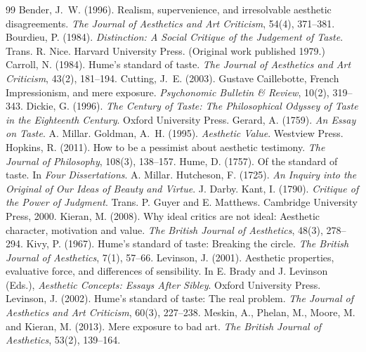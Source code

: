 \documentclass{situationist-preprint}
\begin{document}
\begin{thebibliography}{99}\small
{} Bender, J.~W. (1996). Realism, supervenience, and irresolvable aesthetic disagreements. \emph{The Journal of Aesthetics and Art Criticism}, 54(4), 371--381.
 Bourdieu, P. (1984). \emph{Distinction: A Social Critique of the Judgement of Taste}. Trans. R. Nice. Harvard University Press. (Original work published 1979.)
 Carroll, N. (1984). Hume's standard of taste. \emph{The Journal of Aesthetics and Art Criticism}, 43(2), 181--194.
 Cutting, J.~E. (2003). Gustave Caillebotte, French Impressionism, and mere exposure. \emph{Psychonomic Bulletin \& Review}, 10(2), 319--343.
 Dickie, G. (1996). \emph{The Century of Taste: The Philosophical Odyssey of Taste in the Eighteenth Century}. Oxford University Press.
 Gerard, A. (1759). \emph{An Essay on Taste}. A. Millar.
 Goldman, A.~H. (1995). \emph{Aesthetic Value}. Westview Press.
 Hopkins, R. (2011). How to be a pessimist about aesthetic testimony. \emph{The Journal of Philosophy}, 108(3), 138--157.
 Hume, D. (1757). Of the standard of taste. In \emph{Four Dissertations}. A. Millar.
 Hutcheson, F. (1725). \emph{An Inquiry into the Original of Our Ideas of Beauty and Virtue}. J. Darby.
 Kant, I. (1790). \emph{Critique of the Power of Judgment}. Trans. P. Guyer and E. Matthews. Cambridge University Press, 2000.
 Kieran, M. (2008). Why ideal critics are not ideal: Aesthetic character, motivation and value. \emph{The British Journal of Aesthetics}, 48(3), 278--294.
 Kivy, P. (1967). Hume's standard of taste: Breaking the circle. \emph{The British Journal of Aesthetics}, 7(1), 57--66.
 Levinson, J. (2001). Aesthetic properties, evaluative force, and differences of sensibility. In E. Brady and J. Levinson (Eds.), \emph{Aesthetic Concepts: Essays After Sibley}. Oxford University Press.
 Levinson, J. (2002). Hume's standard of taste: The real problem. \emph{The Journal of Aesthetics and Art Criticism}, 60(3), 227--238.
 Meskin, A., Phelan, M., Moore, M. and Kieran, M. (2013). Mere exposure to bad art. \emph{The British Journal of Aesthetics}, 53(2), 139--164.

\end{thebibliography}
\end{document}
